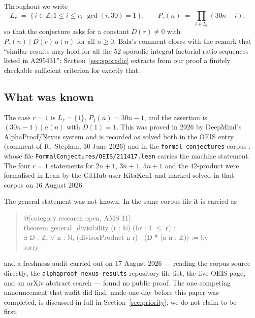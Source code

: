 \documentclass[11pt]{article}
\theoremstyle{plain}
\theoremstyle{definition}
\theoremstyle{remark}
\numberwithin{equation}{section}
\newcommand{\N}{\mathbb{N}}
\newcommand{\Z}{\mathbb{Z}}
\newcommand{\Lr}{L_r}
\begin{document}
Throughout we write
\begin{equation}
  \Lr \;=\; \{\, i \in \Z : 1 \le i \le r,\ \gcd(i,30) = 1 \,\},
  \qquad
  P_r(n) \;=\; \prod_{i \in \Lr} (30n - i),
  \label{eq:Lr}
\end{equation}
so that the conjecture asks for a constant $D(r) \ne 0$ with $P_r(n) \mid D(r)\,a(n)$ for all
$n \ge 0$. Bala's comment closes with the remark that ``similar results may hold for all the $52$
sporadic integral factorial ratio sequences listed in A295431''; Section~\ref{sec:sporadic}
extracts from our proof a finitely checkable sufficient criterion for exactly that.

\subsection{What was known}

The case $r = 1$ is $\Lr = \{1\}$, $P_1(n) = 30n-1$, and the assertion is $(30n-1) \mid a(n)$
with $D(1) = 1$. This was proved in 2026 by DeepMind's AlphaProof/Nexus system \cite{nexus} and
is recorded as solved both in the OEIS entry (comment of R.~Stephan, 30 June 2026) and in the
\texttt{formal-conjectures} corpus \cite{formalconjectures}, whose file
\texttt{FormalConjectures/OEIS/211417.lean} carries the machine statement. The four $r=1$
statements for $2n+1$, $3n+1$, $5n+1$ and the $42$-product were formalised in Lean by the
GitHub user KitaKen1 and marked solved in that corpus on 16 August 2026.

The general statement was not known. In the same corpus file it is carried as
\begin{quote}\ttfamily\small
@[category research open, AMS 11]\\
theorem general\_divisibility (r : $\N$) (hr : 1 $\le$ r) :\\
\hspace*{2em}$\exists$ D : $\Z$, $\forall$ n : $\N$, (divisorProduct n r) $\mid$ (D * (a n : $\Z$)) := by\\
\hspace*{2em}sorry
\end{quote}
and a freshness audit carried out on 17 August 2026 --- reading the corpus source directly, the
\texttt{alphaproof-nexus-results} repository file list, the live OEIS page, and an arXiv
abstract search --- found no public proof. The one competing announcement that audit did find,
made one day before this paper was completed, is discussed in full in
Section~\ref{sec:priority}; we do not claim to be first.
\end{document}
